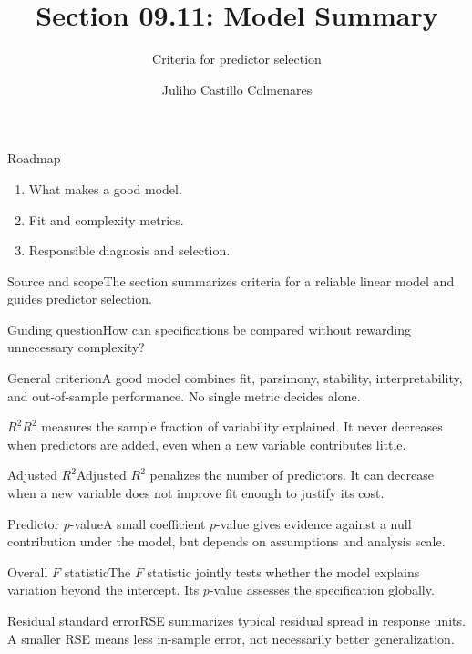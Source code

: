 \documentclass[10pt,aspectratio=169]{beamer}
\title[Model summary]{Section 09.11: Model Summary}\subtitle{Criteria for predictor selection}\author[J. Castillo Colmenares]{Juliho Castillo Colmenares}\institute{Tecnológico de Monterrey}\date{}
\begin{document}
\begin{frame}[plain]\titlepage\end{frame}
\begin{frame}{Roadmap}\small\begin{enumerate}\item What makes a good model.\item Fit and complexity metrics.\item Responsible diagnosis and selection.\end{enumerate}\end{frame}
\begin{frame}{Source and scope}\small The section summarizes criteria for a reliable linear model and guides predictor selection.\begin{block}{Guiding question}How can specifications be compared without rewarding unnecessary complexity?\end{block}\end{frame}
\begin{frame}{General criterion}\small A good model combines fit, parsimony, stability, interpretability, and out-of-sample performance. No single metric decides alone.\end{frame}
\begin{frame}{$R^2$}\small $R^2$ measures the sample fraction of variability explained. It never decreases when predictors are added, even when a new variable contributes little.\end{frame}
\begin{frame}{Adjusted $R^2$}\small Adjusted $R^2$ penalizes the number of predictors. It can decrease when a new variable does not improve fit enough to justify its cost.\end{frame}
\begin{frame}{Predictor $p$-value}\small A small coefficient $p$-value gives evidence against a null contribution under the model, but depends on assumptions and analysis scale.\end{frame}
\begin{frame}{Overall $F$ statistic}\small The $F$ statistic jointly tests whether the model explains variation beyond the intercept. Its $p$-value assesses the specification globally.\end{frame}
\begin{frame}{Residual standard error}\small RSE summarizes typical residual spread in response units. A smaller RSE means less in-sample error, not necessarily better generalization.\end{frame}
\end{document}
